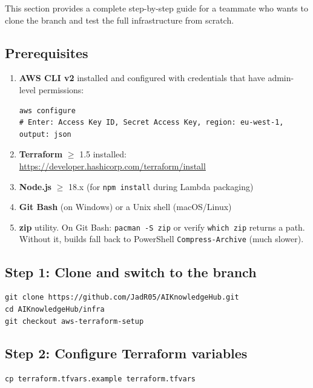 \documentclass[11pt,a4paper]{article}
\begin{document}
This section provides a complete step-by-step guide for a teammate who wants to clone the branch and test the full infrastructure from scratch.

\subsection{Prerequisites}

\begin{enumerate}[leftmargin=*]
  \item \textbf{AWS CLI v2} installed and configured with credentials that have admin-level permissions:
    \begin{lstlisting}[basicstyle=\ttfamily\small]
aws configure
# Enter: Access Key ID, Secret Access Key, region: eu-west-1, output: json
    \end{lstlisting}
  \item \textbf{Terraform} $\geq$ 1.5 installed: \url{https://developer.hashicorp.com/terraform/install}
  \item \textbf{Node.js} $\geq$ 18.x (for \texttt{npm install} during Lambda packaging)
  \item \textbf{Git Bash} (on Windows) or a Unix shell (macOS/Linux)
  \item \textbf{zip} utility. On Git Bash: \texttt{pacman -S zip} or verify \texttt{which zip} returns a path. Without it, builds fall back to PowerShell \texttt{Compress-Archive} (much slower).
\end{enumerate}

\subsection{Step 1: Clone and switch to the branch}

\begin{lstlisting}[basicstyle=\ttfamily\small]
git clone https://github.com/JadR05/AIKnowledgeHub.git
cd AIKnowledgeHub/infra
git checkout aws-terraform-setup
\end{lstlisting}

\subsection{Step 2: Configure Terraform variables}

\begin{lstlisting}[basicstyle=\ttfamily\small]
cp terraform.tfvars.example terraform.tfvars
\end{lstlisting}
\end{document}
